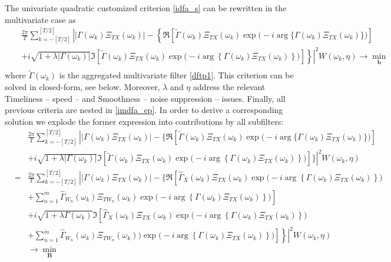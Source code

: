 \documentclass[a4paper]{book}
\begin{document}
The univariate quadratic customized criterion \ref{idfa_s} can be rewritten in the multivariate case as
\begin{eqnarray}\label{imdfa_ep}
&&\frac{2\pi}{T} \sum_{k=-[T/2]}^{[T/2]}
 \left|\big|\Gamma(\omega_k)\Xi_{TX}(\omega_k)\big|-\left\{\Re\left[\tilde{\Gamma}(\omega_k)\Xi_{TX}(\omega_k)\exp\big(-i\arg\big\{\Gamma(\omega_k)\Xi_{TX}(\omega_k)\big\}\big)\right]\right.\right.\nonumber\\
 &&\left.\left.+i\sqrt{1+\lambda|\Gamma(\omega_k)|}
 \Im\left[\tilde{\Gamma}(\omega_k)\Xi_{TX}(\omega_k)\exp\big(-i\arg\left\{\Gamma(\omega_k)\Xi_{TX}(\omega_k)\right\}\big)\right]\right\}\right|^2 W(\omega_k,\eta)\to\min_{\mathbf{b}}\nonumber\\
\end{eqnarray}
where $\tilde{\Gamma}(\omega_k)$ is the aggregated multivariate filter \ref{dftp1}. This criterion can be solved in closed-form, see below. Moreover, $\lambda$ and $\eta$ address the relevant Timeliness -- speed -- and Smoothness -- noise suppression -- issues. Finally, all previous criteria are nested in \ref{imdfa_ep}. In order to derive a corresponding solution we explode the former expression into contributions by all subfilters: 
\begin{eqnarray}
&&\frac{2\pi}{T} \sum_{k=-[T/2]}^{[T/2]}
 \left|\big|\Gamma(\omega_k)\Xi_{TX}(\omega_k)\big|-\Bigg\{\Re\left[\tilde{\Gamma}(\omega_k)\Xi_{TX}(\omega_k)\exp\big(-i\arg\big\{\Gamma(\omega_k)\Xi_{TX}(\omega_k)\big\}\big)\right]\right.\nonumber\\
 &&\left.+i\sqrt{1+\lambda|\Gamma(\omega_k)|}
 \Im\left[\tilde{\Gamma}(\omega_k)\Xi_{TX}(\omega_k)\exp\big(-i\arg\left\{\Gamma(\omega_k)\Xi_{TX}(\omega_k)\right\}\big)\right]\Bigg\}\right|^2 W(\omega_k,\eta)\nonumber\\
&=&\frac{2\pi}{T} \sum_{k=-[T/2]}^{[T/2]}
 \left|\left|\Gamma(\omega_k)\Xi_{TX}(\omega_k)\right|-\Bigg\{\Re\left[\hat{\Gamma}_X(\omega_k)\Xi_{TX}(\omega_k)\exp\big(-i\arg\left\{\Gamma(\omega_k)\Xi_{TX}(\omega_k)\right\}\big)\right.\right.\nonumber\\
&&+\sum_{n=1}^m \left.\hat{\Gamma}_{W_n}(\omega_k)\Xi_{TW_n}(\omega_k)\exp\big(-i\arg\left\{\Gamma(\omega_k)\Xi_{TX}(\omega_k)\right\}\big)\right]\nonumber\\
&&+i\sqrt{1+ \lambda\Gamma(\omega_k)}
 \Im\left[\hat{\Gamma}_X(\omega_k)\Xi_{TX}(\omega_k)\exp\big(-i\arg\left\{\Gamma(\omega_k)\Xi_{TX}(\omega_k)\right\}\big)\right.\nonumber\\
&&\left.\left.+\sum_{n=1}^m\left.\hat{\Gamma}_{W_n}(\omega_k)\Xi_{TW_n}(\omega_k))\exp\big(-i\arg\left\{\Gamma(\omega_k)\Xi_{TX}(\omega_k)\right\}\big)\right]\right\}\right|^2 W(\omega_k,\eta)\nonumber\\
&&\to\min_{\mathbf{B}}\label{imdfa_e}
\end{eqnarray}
\end{document}
